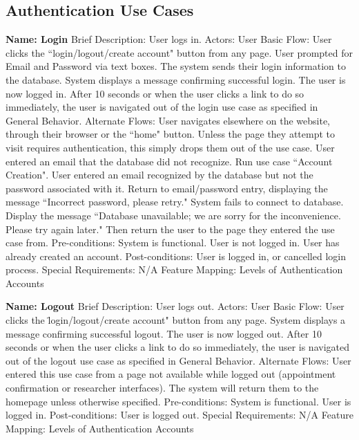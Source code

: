 \subsection{Authentication Use Cases}
\begin{outline}[enumerate]

\1 {\bf Name: Login}
\2 Brief Description: User logs in.
\2 Actors: User
\2 Basic Flow:
\3 User clicks the {``}login/logout/create account" button from any page.
\3 User prompted for Email and Password via text boxes.
\3 The system sends their login information to the database.
\3 System displays a message confirming successful login.  The user is now logged in.
\3 After 10 seconds or when the user clicks a link to do so immediately, the user is navigated out of the login use case as specified in General Behavior.
\2 Alternate Flows:
\3 User navigates elsewhere on the website, through their browser or the ``home" button.  Unless the page they attempt to visit requires authentication, this simply drops them out of the use case.
\3 User entered an email that the database did not recognize.  Run use case ``Account Creation".
\3 User entered an email recognized by the database but not the password associated with it.  Return to email/password entry, displaying the message ``Incorrect password, please retry."
\3 System fails to connect to database.  Display the message ``Database unavailable; we are sorry for the inconvenience.  Please try again later."  Then return the user to the page they entered the use case from.
\2 Pre-conditions:
\3 System is functional.
\3 User is not logged in.
\3 User has already created an account.
\2 Post-conditions:
\3 User is logged in, or cancelled login process.
\2 Special Requirements:
\3 N/A
\2 Feature Mapping:
\3 Levels of Authentication
\3 Accounts

\1 {\bf Name: Logout}
\2 Brief Description: User logs out.
\2 Actors: User
\2 Basic Flow:
\3 User clicks the \"login/logout/create account" button from any page.
\3 System displays a message confirming successful logout.  The user is now logged out.
\3 After 10 seconds or when the user clicks a link to do so immediately, the user is navigated out of the logout use case as specified in General Behavior.
\2 Alternate Flows:
\3 User entered this use case from a page not available while logged out (appointment confirmation or researcher interfaces).  The system will return them to the homepage unless otherwise specified.
\2 Pre-conditions:
\3 System is functional.
\3 User is logged in.
\2 Post-conditions:
\3 User is logged out.
\2 Special Requirements:
\3 N/A
\2 Feature Mapping:
\3 Levels of Authentication
\3 Accounts


\end{outline}
